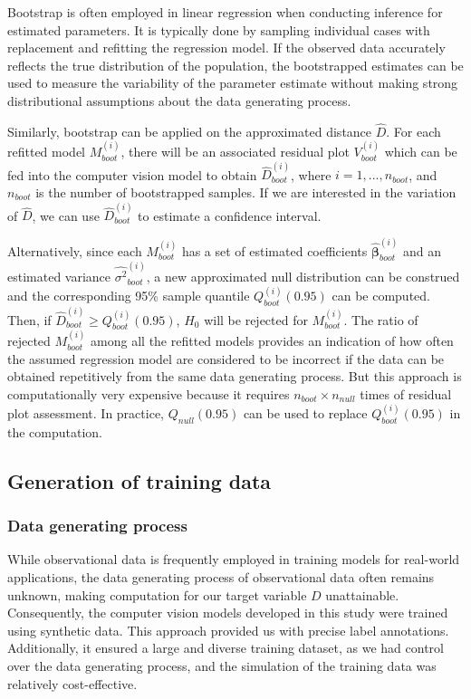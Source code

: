 \documentclass[]{interact}
\theoremstyle{plain}%
\theoremstyle{definition}
\theoremstyle{remark}
\begin{document}
Bootstrap is often employed in linear regression when conducting
inference for estimated parameters. It is typically done by sampling
individual cases with replacement and refitting the regression model. If
the observed data accurately reflects the true distribution of the
population, the bootstrapped estimates can be used to measure the
variability of the parameter estimate without making strong
distributional assumptions about the data generating process.

Similarly, bootstrap can be applied on the approximated distance
\(\hat{D}\). For each refitted model \(M_{boot}^{(i)}\), there will be
an associated residual plot \(V_{boot}^{(i)}\) which can be fed into the
computer vision model to obtain \(\hat{D}_{boot}^{(i)}\), where
\(i = 1,...,n_{boot}\), and \(n_{boot}\) is the number of bootstrapped
samples. If we are interested in the variation of \(\hat{D}\), we can
use \(\hat{D}_{boot}^{(i)}\) to estimate a confidence interval.

Alternatively, since each \(M_{boot}^{(i)}\) has a set of estimated
coefficients \(\hat{\boldsymbol{\beta}}_{boot}^{(i)}\) and an estimated
variance \(\hat{\sigma^2}_{boot}^{(i)}\), a new approximated null
distribution can be construed and the corresponding 95\% sample quantile
\(Q_{boot}^{(i)}(0.95)\) can be computed. Then, if
\(\hat{D}_{boot}^{(i)} \geq Q_{boot}^{(i)}(0.95)\), \(H_0\) will be
rejected for \(M_{boot}^{(i)}\). The ratio of rejected
\(M_{boot}^{(i)}\) among all the refitted models provides an indication
of how often the assumed regression model are considered to be incorrect
if the data can be obtained repetitively from the same data generating
process. But this approach is computationally very expensive because it
requires \(n_{boot} \times n_{null}\) times of residual plot assessment.
In practice, \(Q_{null}(0.95)\) can be used to replace
\(Q_{boot}^{(i)}(0.95)\) in the computation.

\subsection{Generation of training
data}\label{generation-of-training-data}

\subsubsection{Data generating process}\label{data-generating-process}

While observational data is frequently employed in training models for
real-world applications, the data generating process of observational
data often remains unknown, making computation for our target variable
\(D\) unattainable. Consequently, the computer vision models developed
in this study were trained using synthetic data. This approach provided
us with precise label annotations. Additionally, it ensured a large and
diverse training dataset, as we had control over the data generating
process, and the simulation of the training data was relatively
cost-effective.
\end{document}
